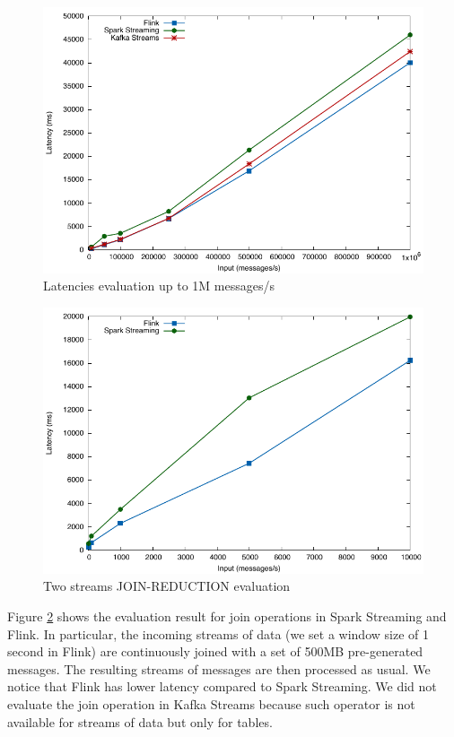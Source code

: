  \begin{figure}[h!]
\includegraphics[width=1\textwidth]{images/engines_1m_cropped.pdf}
 \caption{Latencies evaluation up to 1M messages/s}
\label{fig:results_1m}
\end{figure}

 \begin{figure}[h!]
\includegraphics[width=1\textwidth]{images/join_cropped.pdf}
 \caption{Two streams JOIN-REDUCTION evaluation}
\label{fig:results_join}
\end{figure}


Figure \ref{fig:results_join} shows the evaluation result for join operations in Spark Streaming and Flink. In particular, the incoming streams of data (we set a window size of 1 second in Flink) are continuously joined with a set of 500MB pre-generated messages. The resulting streams of messages are then processed as usual. We notice that Flink has lower latency compared to Spark Streaming. We did not evaluate the join operation in Kafka Streams because such operator is not available for streams of data but only for tables.
